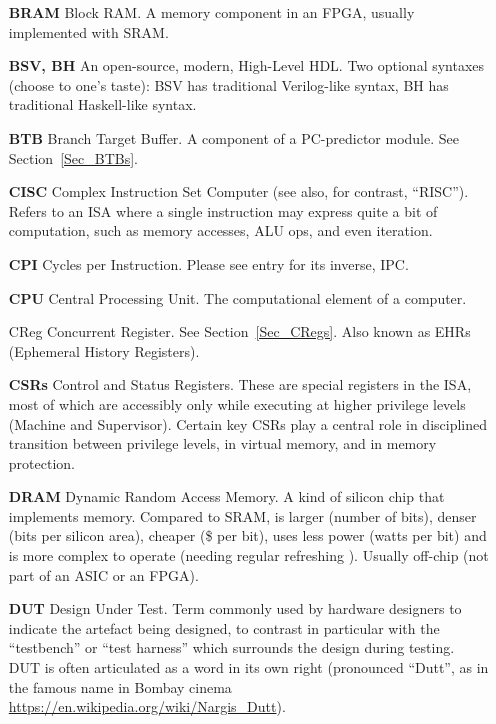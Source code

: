 \begin{itemize}
\item[\bf BRAM] Block RAM.  A memory component in an FPGA, usually
  implemented with SRAM.

\item[\bf BSV, BH] An open-source, modern, High-Level HDL.  Two
  optional syntaxes (choose to one's taste): BSV has traditional
  Verilog-like syntax, BH has traditional Haskell-like syntax.

\item[\bf BTB] Branch Target Buffer.  A component of a PC-predictor
  module.  See Section~\ref{Sec_BTBs}.

\item[\bf CISC] Complex Instruction Set Computer (see also, for
  contrast, ``RISC'').  Refers to an ISA where a single instruction
  may express quite a bit of computation, such as memory accesses, ALU
  ops, and even iteration.

\item[\bf CPI] Cycles per Instruction.  Please see entry for its
  inverse, IPC.

\item[\bf CPU] Central Processing Unit.  The computational element of
  a computer.

\item[CReg] Concurrent Register.  See Section~\ref{Sec_CRegs}.  Also
  known as EHRs (Ephemeral History Registers).

\item[\bf CSRs] Control and Status Registers.  These are special
  registers in the ISA, most of which are accessibly only while
  executing at higher privilege levels (Machine and Supervisor).
  Certain key CSRs play a central role in disciplined transition
  between privilege levels, in virtual memory, and in memory
  protection.

\item[\bf DRAM] Dynamic Random Access Memory.  A kind of silicon chip
  that implements memory.  Compared to SRAM, is larger (number of
  bits), denser (bits per silicon area), cheaper (\$ per bit), uses
  less power (watts per bit) and is more complex to operate (needing
  regular refreshing {\etc}). Usually off-chip (not part of an ASIC or
  an FPGA).

\item[\bf DUT] Design Under Test.  Term commonly used by hardware
  designers to indicate the artefact being designed, to contrast in
  particular with the ``testbench'' or ``test harness'' which
  surrounds the design during testing.  DUT is often articulated as a
  word in its own right (pronounced ``Dutt'', as in the famous name in
  Bombay cinema \url{https://en.wikipedia.org/wiki/Nargis_Dutt}).


\end{itemize}
